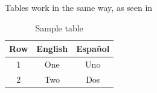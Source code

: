 		Tables work in the same way, as seen in 

		\begin{table}[h!]
			\centering
			\begin{tabular}{c|c|c}
				Row & English & Español \\\hline\hline
				1 & One & Uno \\
				2 & Two & Dos \\
			\end{tabular}
			\caption{Sample table}
			\label{tab:tabla}
		\end{table}
	\blindtext